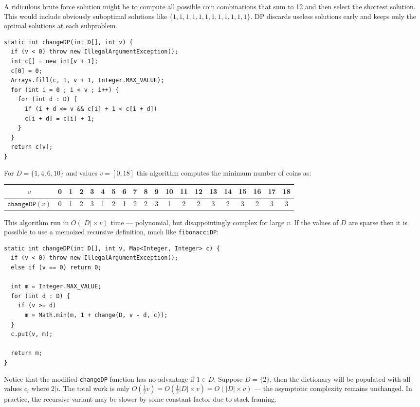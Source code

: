 \documentclass{book}
\begin{document}
A ridiculous brute force solution might be to compute all possible coin combinations that sum to 12 and then select the shortest solution. This would include obviously suboptimal solutions like $\{1,1,1,1,1,1,1,1,1,1,1,1\}$. DP discards useless solutions early and keeps only the optimal solutions at each subproblem.

\begin{lstlisting}
static int changeDP(int D[], int v) {
  if (v < 0) throw new IllegalArgumentException();
  int c[] = new int[v + 1];
  c[0] = 0;
  Arrays.fill(c, 1, v + 1, Integer.MAX_VALUE);
  for (int i = 0 ; i < v ; i++) {
    for (int d : D) {
      if (i + d <= v && c[i] + 1 < c[i + d])
      c[i + d] = c[i] + 1;
    }
  }
  return c[v];
}
\end{lstlisting}

For $D = \{ 1, 4, 6, 10 \}$ and values $v=[0,18]$ this algorithm computes the minimum number of coins as:

\begin{center}
\begin{tabular}{c | c | c | c | c | c | c | c | c | c | c | c | c | c | c | c | c | c | c | c}
$v$ & 0 & 1 & 2 & 3 & 4 & 5 & 6 & 7 & 8 & 9 & 10 & 11 & 12 & 13 & 14 & 15 & 16 & 17 & 18 \\
\hline
$\texttt{changeDP}(v)$ & 0 & 1 & 2 & 3 & 1 & 2 & 1 & 2 & 2 & 3 & 1 & 2 & 2 & 3 & 2 & 3 & 2 & 3 & 3
\end{tabular}
\end{center}

This algorithm run in $O(|D| \times v)$ time --- polynomial, but disappointingly complex for large $v$. If the values of $D$ are sparse then it is possible to use a memoized recursive definition, much like \texttt{fibonacciDP}:

\begin{lstlisting}
static int changeDP(int D[], int v, Map<Integer, Integer> c) {
  if (v < 0) throw new IllegalArgumentException();
  else if (v == 0) return 0;

  int m = Integer.MAX_VALUE;
  for (int d : D) {
    if (v >= d)
      m = Math.min(m, 1 + change(D, v - d, c));
  }
  c.put(v, m);

  return m;
}
\end{lstlisting}

Notice that the modified \texttt{changeDP} function has no advantage if $1 \in D$. Suppose $D = \{ 2 \}$, then the dictionary will be populated with all values $c_i$ where $2 | i$. The total work is only $O(\frac{1}{2} v) = O(\frac{1}{2} |D| \times v) = O(|D| \times v)$ --- the asymptotic complexity remains unchanged. In practice, the recursive variant may be slower by some constant factor due to stack framing. 
\end{document}
